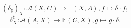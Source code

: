 \documentclass[preview]{standalone}
\begin{document}
\begin{center}
$$(\delta_\sharp)_X: \mathscr{A}(X,C) \to \mathbb{E}(X,A), f\mapsto \delta\cdot f;$$$$\delta_X^\sharp:\mathscr{A}(A,X) \to \mathbb{E}(C,X), g\mapsto g\cdot\delta.$$
\end{center}
\end{document}
